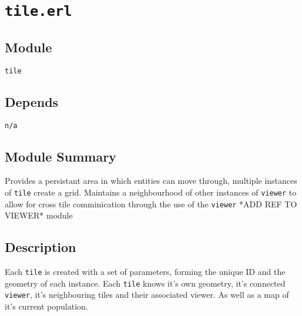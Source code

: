 \pagestyle{empty}
\section{\tt tile.erl}
\subsection{Module}
\verb+tile+
\subsection{Depends}
{\tt n/a}
\subsection{Module Summary}
Provides a persistant area in which entities can move through, multiple instances of \verb+tile+ create a grid.
Maintains a neighbourhood of other instances of \verb+viewer+ to allow for cross tile comminication through the use of the \verb+viewer+ *ADD REF TO VIEWER* module
\subsection{Description}
Each \verb+tile+ is created with a set of parameters, forming the unique ID and the geometry of each instance.
Each \verb+tile+ knows it's own geometry, it's connected \verb+viewer+, it's neighbouring tiles and their associated viewer. As well as a map of it's current population.
